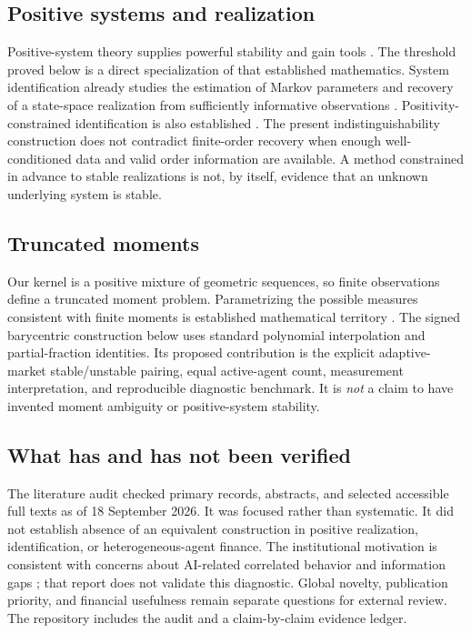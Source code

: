 \documentclass[11pt]{article}
\theoremstyle{remark}\newtheorem{remark}[theorem]{Remark}
\begin{document}
\subsection{Positive systems and realization}
Positive-system theory supplies powerful stability and gain tools \citep{rantzer2015}. The threshold proved below is a direct specialization of that established mathematics. System identification already studies the estimation of Markov parameters and recovery of a state-space realization from sufficiently informative observations \citep{oymak2019}. Positivity-constrained identification is also established \citep{umenberger2016}. The present indistinguishability construction does not contradict finite-order recovery when enough well-conditioned data and valid order information are available. A method constrained in advance to stable realizations is not, by itself, evidence that an unknown underlying system is stable.

\subsection{Truncated moments}
Our kernel is a positive mixture of geometric sequences, so finite observations define a truncated moment problem. Parametrizing the possible measures consistent with finite moments is established mathematical territory \citep{fritzsche2020}. The signed barycentric construction below uses standard polynomial interpolation and partial-fraction identities. Its proposed contribution is the explicit adaptive-market stable/unstable pairing, equal active-agent count, measurement interpretation, and reproducible diagnostic benchmark. It is \emph{not} a claim to have invented moment ambiguity or positive-system stability.

\subsection{What has and has not been verified}
The literature audit checked primary records, abstracts, and selected accessible full texts as of 18 September 2026. It was focused rather than systematic. It did not establish absence of an equivalent construction in positive realization, identification, or heterogeneous-agent finance. The institutional motivation is consistent with concerns about AI-related correlated behavior and information gaps \citep{fsb2024}; that report does not validate this diagnostic. Global novelty, publication priority, and financial usefulness remain separate questions for external review. The repository includes the audit and a claim-by-claim evidence ledger.
\end{document}
